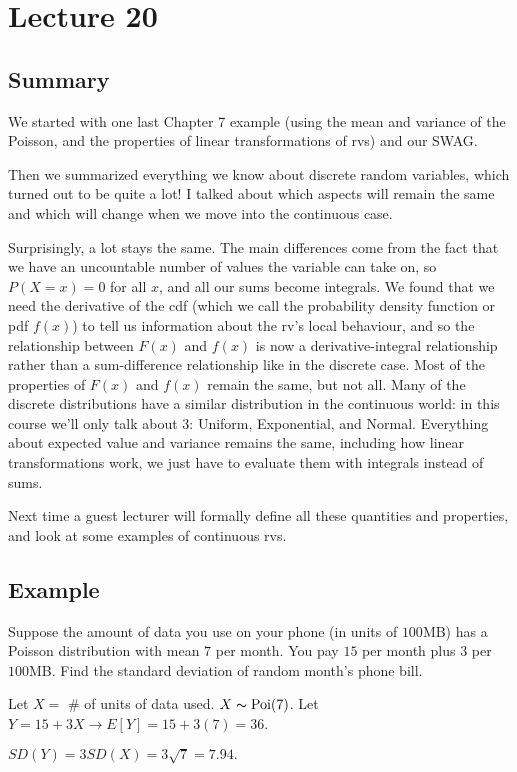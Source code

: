 \section{Lecture 20}
\subsection{Summary}
We started with one last Chapter 7 example (using the mean and variance of the Poisson, and the properties of linear transformations of rvs) and our SWAG.

Then we summarized everything we know about discrete random variables, which turned out to be quite a lot! I talked about which aspects will remain the same and which will change when we move into the continuous case.

Surprisingly, a lot stays the same. The main differences come from the fact that we have an uncountable number of values the variable can take on, so $P(X=x) = 0$ for all $x$, and all our sums become integrals. We found that we need the derivative of the cdf (which we call the probability density function or pdf $f(x)$) to tell us information about the rv's local behaviour, and so the relationship between $F(x)$ and $f(x)$ is now a derivative-integral relationship rather than a sum-difference relationship like in the discrete case. Most of the properties of $F(x)$ and $f(x)$ remain the same, but not all. Many of the discrete distributions have a similar distribution in the continuous world: in this course we'll only talk about 3: Uniform, Exponential, and Normal. Everything about expected value and variance remains the same, including how linear transformations work, we just have to evaluate them with integrals instead of sums.

Next time a guest lecturer will formally define all these quantities and properties, and look at some examples of continuous rvs.

\subsection{Example}
Suppose the amount of data you use on your phone (in units of $ 100 $MB) has
a Poisson distribution with mean $ 7 $ per month. You pay $ 15 $ per
month plus $ 3 $ per $ 100 $MB. Find the standard deviation of random
month's phone bill.

Let $ X= $ \# of units of data used. $ X \thicksim \operatorname{Poi}(7) $. Let
$ Y=15+3X\rightarrow E[Y]=15+3(7)=36 $. 

$ SD(Y)=3SD(X)=3\sqrt{7}=7.94. $